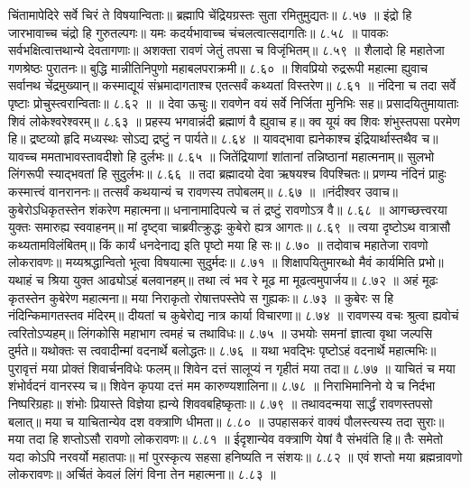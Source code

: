 चिंतामापेदिरे सर्वे चिरं ते विषयान्विताः॥
ब्रह्मापि चेंद्रियग्रस्तः सुता रमितुमुद्यतः॥ ८.५७ ॥
इंद्रो हि जारभावाच्च चंद्रो हि गुरुतल्पगः॥
यमः कदर्यभावाच्च चंचलत्वात्सदागतिः॥ ८.५८ ॥
पावकः सर्वभक्षित्वात्तथान्ये देवतागणाः॥
अशक्ता रावणं जेतुं तपसा च विजृंभितम्॥ ८.५९ ॥
शैलादो हि महातेजा गणश्रेष्ठः पुरातनः॥
बुद्धि मान्नीतिनिपुणो महाबलपराक्रमी॥ ८.६० ॥
शिवप्रियो रुद्ररूपी महात्मा ह्युवाच सर्वानथ चेंद्रमुख्यान्॥
कस्माद्यूयं संभ्रमादागताश्च एतत्सर्वं कथ्यतां विस्तरेण॥ ८.६१ ॥
नंदिना च तदा सर्वे पृष्टाः प्रोचुस्त्वरान्विताः॥ ८.६२ ॥
॥ देवा ऊचुः॥
रावणेन वयं सर्वे निर्जिता मुनिभिः सह॥
प्रसादयितुमायाताः शिवं लोकेश्वरेश्वरम्॥ ८.६३ ॥
प्रहस्य भगवान्नंदी ब्रह्माणं वै ह्युवाच ह॥
क्व यूयं क्व शिवः शंभुस्तपसा परमेण हि॥
द्रष्टव्यो हृदि मध्यस्थः सोऽद्य द्रष्टुं न पार्यते॥ ८.६४ ॥
यावद्भावा ह्यनेकाश्च इंद्रियार्थास्तथैव च॥
यावच्च ममताभावस्तावदीशो हि दुर्लभः॥ ८.६५ ॥
जितेंद्रियाणां शांतानां तन्निष्ठानां महात्मनाम्॥
सुलभो लिंगरूपी स्याद्भवतां हि सुदुर्लभः॥ ८.६६ ॥
तदा ब्रह्मादयो देवा ऋषयश्च विपश्चितः॥
प्रणम्य नंदिनं प्राहुः कस्मात्त्वं वानराननः॥
तत्सर्वं कथयान्यं च रावणस्य तपोबलम्॥ ८.६७ ॥
॥नंदीश्वर उवाच॥
कुबेरोऽधिकृतस्तेन शंकरेण महात्मना॥
धनानामादिपत्ये च तं द्रष्टुं रावणोऽत्र वै॥ ८.६८ ॥
आगच्छत्त्वरया युक्तः समारुह्य स्ववाहनम्॥
मां दृष्ट्वा चाब्रवीत्क्रुद्धः कुबेरो ह्यत्र आगतः॥ ८.६९ ॥
त्वया दृष्टोऽथ वात्रासौ कथ्यतामविलंबितम्॥
किं कार्यं धनदेनाद्य इति पृष्टो मया हि सः॥ ८.७० ॥
तदोवाच महातेजा रावणो लोकरावणः॥
मय्यश्रद्धान्वितो भूत्वा विषयात्मा सुदुर्मदः॥ ८.७१ ॥
शिक्षापयितुमारब्धो मैवं कार्यमिति प्रभो॥
यथाहं च श्रिया युक्त आढ्योऽहं बलवानहम्॥
तथा त्वं भव रे मूढ मा मूढत्वमुपार्जय॥ ८.७२ ॥
अहं मूढः कृतस्तेन कुबेरेण महात्मना॥
मया निराकृतो रोषात्तपस्तेपे स गुह्यकः॥ ८.७३ ॥
कुबेरः स हि नंदिन्किमागतस्तव मंदिरम्॥
दीयतां च कुबेरोद्य नात्र कार्या विचारणा॥ ८.७४ ॥
रावणस्य वचः श्रुत्वा ह्यवोचं त्वरितोऽप्यहम्॥
लिंगकोसि महाभाग त्वमहं च तथाविधः॥ ८.७५ ॥
उभयोः समनां ज्ञात्वा वृथा जल्पसि दुर्मते॥
यथोक्तः स त्ववादीन्मां वदनार्थे बलोद्धतः॥ ८.७६ ॥
यथा भवद्भिः पृष्टोऽहं वदनार्थे महात्मभिः॥
पुरावृत्तं मया प्रोक्तं शिवार्चनविधेः फलम्॥
शिवेन दत्तं सालूप्यं न गृहीतं मया तदा॥ ८.७७ ॥
याचितं च मया शंभोर्वदनं वानरस्य च॥
शिवेन कृपया दत्तं मम कारुण्यशालिना॥ ८.७८ ॥
निराभिमानिनो ये च निर्दभा निष्परिग्रहाः॥
शंभोः प्रियास्ते विज्ञेया ह्यन्ये शिववबहिष्कृताः॥ ८.७९ ॥
तथावदन्मया सार्द्धं रावणस्तपसो बलात्॥
मया च याचितान्येव दश वक्त्राणि धीमता॥ ८.८० ॥
उपहासकरं वाक्यं पौलस्त्यस्य तदा सुराः॥
मया तदा हि शप्तोऽसौ रावणो लोकरावणः॥ ८.८१ ॥
ईदृशान्येव वक्त्राणि येषां वै संभवंति हि॥
तैः समेतो यदा कोऽपि नरवर्यो महातपाः॥
मां पुरस्कृत्य सहसा हनिष्यति न संशयः॥ ८.८२ ॥
एवं शप्तो मया ब्रह्मन्रावणो लोकरावणः॥
अर्चितं केवलं लिंगं विना तेन महात्मना॥ ८.८३ ॥
